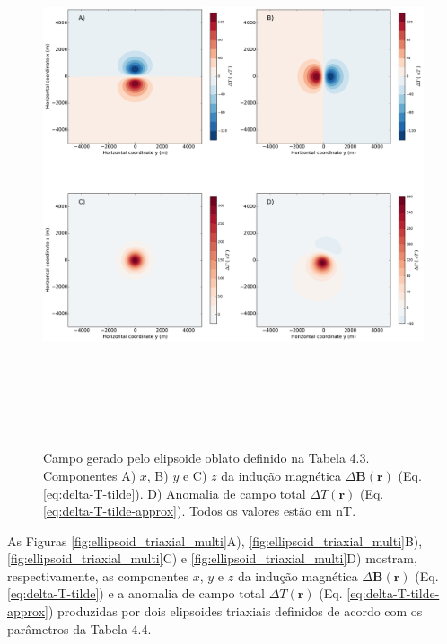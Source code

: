\begin{figure}[hbt!]
	\centering \includegraphics[width=16cm,height=16cm]{figures/ellipsoid_oblate}
	\caption[Campo gerado pelo elipsoide oblato definido na Tabela 4.3. Componentes A) $x$, B) $y$ e C) $z$ da indução magnética $\Delta \mathbf{B}(\mathbf{r})$ (Eq. \ref{eq:delta-T-tilde}). D) Anomalia de campo total $\Delta T (\mathbf{r})$ (Eq. \ref{eq:delta-T-tilde-approx}). Todos os valores estão em nT.]{Campo gerado pelo elipsoide oblato definido na Tabela 4.3. Componentes A) $x$, B) $y$ e C) $z$ da indução magnética $\Delta \mathbf{B}(\mathbf{r})$ (Eq. \ref{eq:delta-T-tilde}). D) Anomalia de campo total $\Delta T (\mathbf{r})$ (Eq. \ref{eq:delta-T-tilde-approx}). Todos os valores estão em nT.}
	\label{fig:oblate}
\end{figure}

As Figuras \ref{fig:ellipsoid_triaxial_multi}A), \ref{fig:ellipsoid_triaxial_multi}B), \ref{fig:ellipsoid_triaxial_multi}C) e \ref{fig:ellipsoid_triaxial_multi}D) mostram, respectivamente, as componentes $x$, $y$ e $z$ da indução magnética $\Delta \mathbf{B}(\mathbf{r})$ (Eq. \ref{eq:delta-T-tilde}) e a
anomalia de campo total $\Delta T (\mathbf{r})$ (Eq. \ref{eq:delta-T-tilde-approx}) produzidas por dois elipsoides triaxiais definidos de acordo com os parâmetros da Tabela 4.4.


